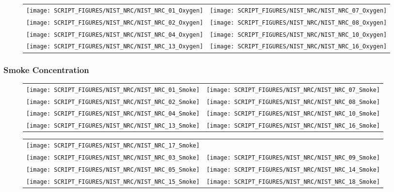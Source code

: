 \begin{figure}[!ht]
\begin{tabular*}{\textwidth}{l@{\extracolsep{\fill}}r}
\texttt{[image: SCRIPT\_FIGURES/NIST\_NRC/NIST\_NRC\_01\_Oxygen]} &
\texttt{[image: SCRIPT\_FIGURES/NIST\_NRC/NIST\_NRC\_07\_Oxygen]} \\
\texttt{[image: SCRIPT\_FIGURES/NIST\_NRC/NIST\_NRC\_02\_Oxygen]} &
\texttt{[image: SCRIPT\_FIGURES/NIST\_NRC/NIST\_NRC\_08\_Oxygen]} \\
\texttt{[image: SCRIPT\_FIGURES/NIST\_NRC/NIST\_NRC\_04\_Oxygen]} &
\texttt{[image: SCRIPT\_FIGURES/NIST\_NRC/NIST\_NRC\_10\_Oxygen]} \\
\texttt{[image: SCRIPT\_FIGURES/NIST\_NRC/NIST\_NRC\_13\_Oxygen]} &
\texttt{[image: SCRIPT\_FIGURES/NIST\_NRC/NIST\_NRC\_16\_Oxygen]} \\
\end{tabular*}
\label{NIST_NRC_Gas_Closed_1}
\end{figure}

\clearpage

\subsubsection{Smoke Concentration}

\begin{figure}[!ht]
\begin{tabular*}{\textwidth}{l@{\extracolsep{\fill}}r}
\texttt{[image: SCRIPT\_FIGURES/NIST\_NRC/NIST\_NRC\_01\_Smoke]} &
\texttt{[image: SCRIPT\_FIGURES/NIST\_NRC/NIST\_NRC\_07\_Smoke]} \\
\texttt{[image: SCRIPT\_FIGURES/NIST\_NRC/NIST\_NRC\_02\_Smoke]} &
\texttt{[image: SCRIPT\_FIGURES/NIST\_NRC/NIST\_NRC\_08\_Smoke]} \\
\texttt{[image: SCRIPT\_FIGURES/NIST\_NRC/NIST\_NRC\_04\_Smoke]} &
\texttt{[image: SCRIPT\_FIGURES/NIST\_NRC/NIST\_NRC\_10\_Smoke]} \\
\texttt{[image: SCRIPT\_FIGURES/NIST\_NRC/NIST\_NRC\_13\_Smoke]} &
\texttt{[image: SCRIPT\_FIGURES/NIST\_NRC/NIST\_NRC\_16\_Smoke]}
\end{tabular*}
\end{figure}

\begin{figure}[!ht]
\begin{tabular*}{\textwidth}{l@{\extracolsep{\fill}}r}
\texttt{[image: SCRIPT\_FIGURES/NIST\_NRC/NIST\_NRC\_17\_Smoke]} &
 \\
\texttt{[image: SCRIPT\_FIGURES/NIST\_NRC/NIST\_NRC\_03\_Smoke]} &
\texttt{[image: SCRIPT\_FIGURES/NIST\_NRC/NIST\_NRC\_09\_Smoke]} \\
\texttt{[image: SCRIPT\_FIGURES/NIST\_NRC/NIST\_NRC\_05\_Smoke]} &
\texttt{[image: SCRIPT\_FIGURES/NIST\_NRC/NIST\_NRC\_14\_Smoke]} \\
\texttt{[image: SCRIPT\_FIGURES/NIST\_NRC/NIST\_NRC\_15\_Smoke]} &
\texttt{[image: SCRIPT\_FIGURES/NIST\_NRC/NIST\_NRC\_18\_Smoke]}
\end{tabular*}
\end{figure}

